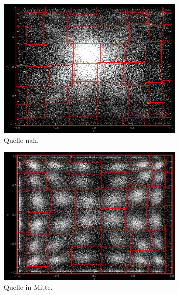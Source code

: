 \documentclass[slug=PET, room=Andreas-Schubert-Bau\,\ 424A,
supervisor=Carsten\ Bittrich, coursedate=10.\ 01.\ 2020, ngerman]{../../Lab_Report_LaTeX/lab_report}
\begin{document}
\begin{figure}[h!]
  \centering
  \begin{subfigure}{0.32\textwidth}
    \centering
    \includegraphics[width=.9\textwidth]{../messungen/kalib/vergleich_mitte_nah_NAH.png}
    \caption{Quelle nah.}
    \label{fig:ab-nah}
  \end{subfigure}
  \begin{subfigure}{0.32\textwidth}
    \centering
    \includegraphics[width=.9\textwidth]{../messungen/kalib/vergleich_mitte_nah_MITTE.png}
    \caption{Quelle in Mitte.}
    \label{fig:ab-mitte}
  \end{subfigure}
  \begin{subfigure}{0.32\textwidth}
    \centering

\end{subfigure}
\end{figure}
\end{document}
